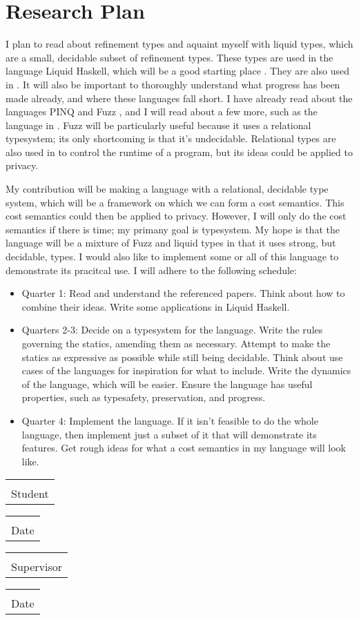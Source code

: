 \documentclass[11pt]{scrartcl}
\makeatletter
\newcommand{\titledate}[2][2.5in]{%
  \noindent%
  \begin{tabular}{@{}p{#1}@{}}
    \\ \hline \\[-.75\normalbaselineskip]
    #2
  \end{tabular} \hspace{1in}
  \begin{tabular}{@{}p{#1}@{}}
    \\ \hline \\[-.75\normalbaselineskip]
    Date
  \end{tabular}
}
\makeatother
\begin{document}
\section{Research Plan}
I plan to read about refinement types and aquaint myself with liquid types, which are a small, decidable subset of refinement types. These types are used in the language Liquid Haskell, which will be a good starting place \cite{Vazou:2014}. They are also used in \cite{Knowles:2007}. It will also be important to thoroughly understand what progress has been made already, and where these languages fall short. I have already read about the languages PINQ \cite{McSherry:2010} and Fuzz \cite{Reed:2010}, and I will read about a few more, such as the language in \cite{Barthe:2016}. Fuzz  will be particularly useful because it uses a relational typesystem; its only shortcoming is that it's undecidable. Relational types are also used in \cite{Barthe:2014} to control the runtime of a program, but its ideas could be applied to privacy. \par
My contribution will be making a language with a relational, decidable type system, which will be a framework on which we can form a cost semantics. This cost semantics could then be applied to privacy. However, I will only do the cost semantics if there is time; my primany goal is typesystem. My hope is that the language will be a mixture of Fuzz and liquid types in that it uses strong, but decidable, types. I would also like to implement some or all of this language to demonstrate its pracitcal use. I will adhere to the following schedule:
\begin{itemize}
\item Quarter 1: Read and understand the referenced papers. Think about how to combine their ideas. Write some applications in Liquid Haskell.
\item Quarters 2-3: Decide on a typesystem for the language. Write the rules governing the statics, amending them as necessary. Attempt to make the statics as expressive as possible while still being decidable. Think about use cases of the languages for inspiration for what to include. Write the dynamics of the language, which will be easier. Ensure the language has useful properties, such as typesafety, preservation, and progress.
\item Quarter 4: Implement the language. If it isn't feasible to do the whole language, then implement just a subset of it that will demonstrate its features. Get rough ideas for what a cost semantics in my language will look like.
\end{itemize}
\vspace{.5in}
\titledate{Student}

\titledate{Supervisor}


\end{document}
